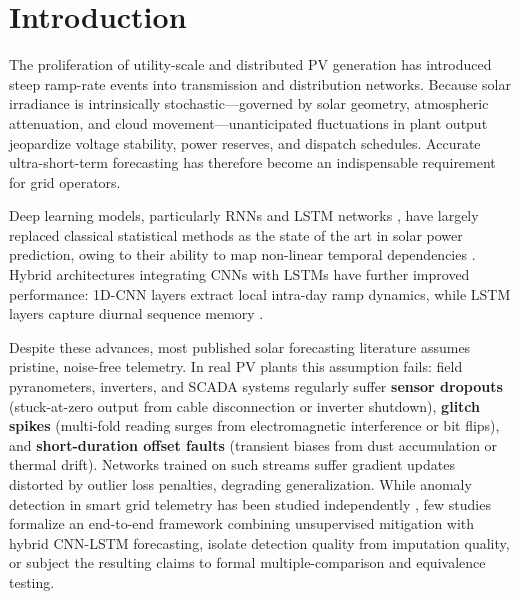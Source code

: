 \documentclass[conference]{IEEEtran}
\begin{document}
\section{Introduction}

The proliferation of utility-scale and distributed PV generation has introduced steep ramp-rate events into transmission and distribution networks. Because solar irradiance is intrinsically stochastic---governed by solar geometry, atmospheric attenuation, and cloud movement---unanticipated fluctuations in plant output jeopardize voltage stability, power reserves, and dispatch schedules. Accurate ultra-short-term forecasting has therefore become an indispensable requirement for grid operators.

Deep learning models, particularly RNNs and LSTM networks \cite{hochreiter1997lstm}, have largely replaced classical statistical methods as the state of the art in solar power prediction, owing to their ability to map non-linear temporal dependencies \cite{mellit2021deep, sobri2018review}. Hybrid architectures integrating CNNs with LSTMs have further improved performance: 1D-CNN layers extract local intra-day ramp dynamics, while LSTM layers capture diurnal sequence memory \cite{zang2020cnnlstm, obiora2021hourly, qu2021dayahead, boucetta2024enhanced}.

Despite these advances, most published solar forecasting literature assumes pristine, noise-free telemetry. In real PV plants this assumption fails: field pyranometers, inverters, and SCADA systems regularly suffer \textbf{sensor dropouts} (stuck-at-zero output from cable disconnection or inverter shutdown), \textbf{glitch spikes} (multi-fold reading surges from electromagnetic interference or bit flips), and \textbf{short-duration offset faults} (transient biases from dust accumulation or thermal drift). Networks trained on such streams suffer gradient updates distorted by outlier loss penalties, degrading generalization. While anomaly detection in smart grid telemetry has been studied independently \cite{zhang2021survey}, few studies formalize an end-to-end framework combining unsupervised mitigation with hybrid CNN-LSTM forecasting, isolate detection quality from imputation quality, or subject the resulting claims to formal multiple-comparison and equivalence testing.
\end{document}
